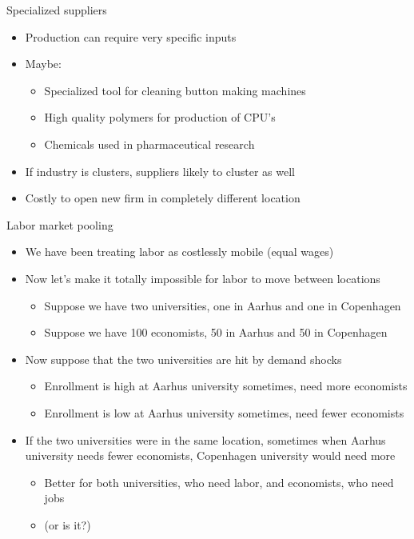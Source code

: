 \documentclass[ignorenonframetext,]{beamer}
\begin{document}
\begin{frame}{Specialized suppliers}

    \begin{itemize}
        \item Production can require very specific inputs 
        \item Maybe: 
        \begin{itemize}
            \item Specialized tool for cleaning button making machines
            \item High quality polymers for production of CPU's
            \item Chemicals used in pharmaceutical research
        \end{itemize}
        \item If industry is clusters, suppliers likely to cluster as well
        \item Costly to open new firm in completely different location
    \end{itemize}

\end{frame}

\begin{frame}{Labor market pooling}

    \begin{itemize}
        \item We have been treating labor as costlessly mobile (equal wages)
        \item Now let's make it totally impossible for labor to move between locations
        \begin{itemize}
            \item Suppose we have two universities, one in Aarhus and one in Copenhagen
            \item Suppose we have 100 economists, 50 in Aarhus and 50 in Copenhagen
        \end{itemize}
        \item Now suppose that the two universities are hit by demand shocks
        \begin{itemize}
            \item Enrollment is high at Aarhus university sometimes, need more economists
            \item Enrollment is low at Aarhus university sometimes, need fewer economists
        \end{itemize}
        \item If the two universities were in the same location, sometimes when Aarhus university needs fewer economists, Copenhagen university would need more 
        \begin{itemize}
            \item Better for both universities, who need labor, and economists, who need jobs
            \item (or is it?)
        \end{itemize}
    \end{itemize}

\end{frame}
\end{document}
